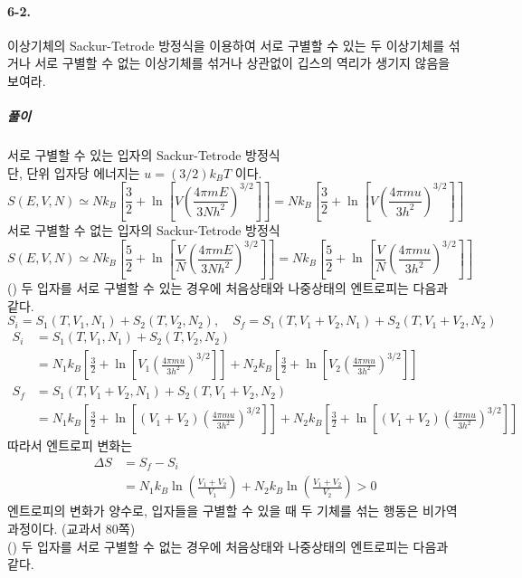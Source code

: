 \documentclass[a4paper,12pt]{report}
\begin{document}
	\paragraph{6-2. } 이상기체의 Sackur-Tetrode 방정식을 이용하여 서로 구별할 수 있는 두 이상기체를 섞거나 서로 구별할 수 없는 이상기체를 섞거나 상관없이 깁스의 역리가 생기지 않음을 보여라. 
	\subparagraph{풀이} 서로 구별할 수 있는 입자의 Sackur-Tetrode 방정식\\  단, 단위 입자당 에너지는 $u=(3/2)k_BT$  이다. 
	$$S(E,V,N)\simeq Nk_B\left[\frac{3}{2}+\ln\left[V\left(\frac{4\pi mE}{3Nh^2} \right)^{3/2}  \right]  \right]=Nk_B\left[\frac{3}{2}+\ln\left[V\left(\frac{4\pi mu}{3h^2} \right)^{3/2}  \right]  \right] $$
	서로 구별할 수 없는 입자의 Sackur-Tetrode 방정식
	$$S(E,V,N)\simeq Nk_B\left[\frac{5}{2}+\ln\left[\frac{V}{N}\left(\frac{4\pi mE}{3Nh^2} \right)^{3/2}  \right]  \right]=Nk_B\left[\frac{5}{2}+\ln\left[\frac{V}{N}\left(\frac{4\pi mu}{3h^2} \right)^{3/2}  \right]  \right] $$
	() 두 입자를 서로 구별할 수 있는 경우에 처음상태와 나중상태의 엔트로피는 다음과 같다. 
	$$S_i=S_1(T,V_1,N_1)+S_2(T,V_2,N_2),\quad S_f=S_1(T,V_1+V_2,N_1)+S_2(T,V_1+V_2,N_2)$$
	\begin{equation*}
		\begin{split}
		S_i&=S_1(T,V_1,N_1)+S_2(T,V_2,N_2)\\
		&=N_1k_B\left[\frac{3}{2}+\ln\left[V_1\left(\frac{4\pi mu}{3h^2} \right)^{3/2}  \right]  \right]+N_2k_B\left[\frac{3}{2}+\ln\left[V_2\left(\frac{4\pi mu}{3h^2} \right)^{3/2}  \right]  \right]\\
		S_f&=S_1(T,V_1+V_2,N_1)+S_2(T,V_1+V_2,N_2)\\
		&=N_1k_B\left[\frac{3}{2}+\ln\left[(V_1+V_2)\left(\frac{4\pi mu}{3h^2} \right)^{3/2}  \right]  \right]+N_2k_B\left[\frac{3}{2}+\ln\left[(V_1+V_2)\left(\frac{4\pi mu}{3h^2} \right)^{3/2}  \right]  \right]
		\end{split}
	\end{equation*}
	따라서 엔트로피 변화는 
	\begin{equation*}
		\begin{split}
		\Delta S&=S_f-S_i\\
		&=N_1k_B\ln\left(\frac{V_1+V_2}{V_1} \right)+N_2k_B\ln\left( \frac{V_1+V_2}{V_2}\right) >0 
		\end{split}
	\end{equation*}
	엔트로피의 변화가 양수로, 입자들을 구별할 수 있을 때 두 기체를 섞는 행동은 비가역과정이다. (교과서 80쪽)\\
	() 두 입자를 서로 구별할 수 없는 경우에 처음상태와 나중상태의 엔트로피는 다음과 같다. 
\end{document}
